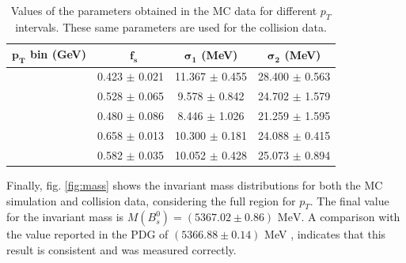 \begin{table}[htp!]
	
	\begin{center}
		\begin{tabular}{|c|c|c|c|}
			\hline
			\textbf{$\mathbf{p_T}$ bin (GeV)} & \ $\mathbf{f_s}$ & \textbf{$\mathbf{\sigma_1}$ (MeV) }& \textbf{$\mathbf{\sigma_2}$ (MeV)}\\ \hline
			[7, 10] & 0.423 $\pm$ 0.021 & 11.367 $\pm$ 0.455 &28.400 $\pm$ 0.563\\ \hline 
			[10, 15] & 0.528 $\pm$ 0.065 & 9.578 $\pm$ 0.842 &24.702 $\pm$ 1.579\\ \hline 
			[15, 20] & 0.480 $\pm$ 0.086 & 8.446 $\pm$ 1.026 &21.259 $\pm$ 1.595\\ \hline 
			[20, 50] & 0.658 $\pm$ 0.013 & 10.300 $\pm$ 0.181 &24.088 $\pm$ 0.415\\ \hline 
			[7, 50] & 0.582 $\pm$ 0.035 & 10.052 $\pm$ 0.428 &25.073 $\pm$ 0.894\\ \hline 
		\end{tabular}
	\end{center}
	\caption{Values of the parameters obtained in the MC data for different $p_T$ intervals. These same parameters are used for the collision data.}
	\label{table:mc_ptbins}
\end{table}


Finally, fig. \ref{fig:mass} shows the invariant mass distributions for both the MC simulation and collision data, considering the full region for $p_T$. The final value for the invariant mass is $M(B^0_s) = (5367.02 \pm 0.86) \text{ MeV}$. A comparison with the value reported in the PDG of $(5366.88 \pm 0.14)$ MeV \cite{pdgstrange}, indicates that this result is consistent and was measured correctly.

\cleardoublepage

